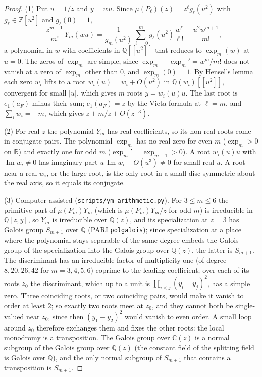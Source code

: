 \documentclass[final]{siamart0516}
\numberwithin{theorem}{section}
\numberwithin{equation}{section}
\theoremstyle{siamnonum}
\theoremstyle{plain}
\newcommand{\code}[1]{{\ttfamily\nolinkurl{#1}}}
\newcommand{\ZZ}{\mathbb{Z}}
\newcommand{\QQ}{\mathbb{Q}}
\newcommand{\RR}{\mathbb{R}}
\newcommand{\CC}{\mathbb{C}}
\newcommand{\Qz}{\QQ(z)}
\renewcommand{\Im}{\operatorname{Im}}
\begin{document}
\begin{proof}
(1) Put $u=1/z$ and $y=wu$. Since $\mu(P_\ell)(z)=z^{\ell}g_\ell(u^{2})$ with $g_\ell\in\ZZ[u^{2}]$ and $g_\ell(0)=1$,
\[
-\frac{z^{m-1}}{m!}\,Y_m(wu)=\frac{1}{g_m(u^{2})}\sum_{\ell=0}^{m}g_\ell(u^{2})\frac{w^{\ell}}{\ell!}-\frac{u^{2}w^{m+1}}{m!},
\]
a polynomial in $w$ with coefficients in $\QQ[[u^{2}]]$ that reduces to $\exp_m(w)$ at $u=0$. The zeros of $\exp_m$ are simple, since $\exp_m-\exp_m'=w^{m}/m!$ does not vanish at a zero of $\exp_m$ other than $0$, and $\exp_m(0)=1$. By Hensel's lemma each zero $w_i$ lifts to a root $w_i(u)=w_i+O(u^{2})$ in $\QQ(w_i)[[u^{2}]]$, convergent for small $|u|$, which gives $m$ roots $y=w_i(u)u$. The last root is $e_1(a_F)$ minus their sum; $e_1(a_F)=z$ by the Vieta formula at $\ell=m$, and $\sum_iw_i=-m$, which gives $z+m/z+O(z^{-3})$.

(2) For real $z$ the polynomial $Y_m$ has real coefficients, so its non-real roots come in conjugate pairs. The polynomial $\exp_m$ has no real zero for even $m$ ($\exp_m>0$ on $\RR$) and exactly one for odd $m$ ($\exp_m'=\exp_{m-1}>0$). A root $w_i(u)u$ with $\Im w_i\neq0$ has imaginary part $u\,\Im w_i+O(u^{3})\neq0$ for small real $u$. A root near a real $w_i$, or the large root, is the only root in a small disc symmetric about the real axis, so it equals its conjugate.

(3) Computer-assisted (\code{scripts/ym_arithmetic.py}). For $3\le m\le6$ the primitive part of $\mu(P_m)Y_m$ (which is $\mu(P_m)Y_m/z$ for odd $m$) is irreducible in $\QQ[z,y]$, so $Y_m$ is irreducible over $\Qz$, and its specialization at $z=3$ has Galois group $S_{m+1}$ over $\QQ$ (PARI \code{polgalois}); since specialization at a place where the polynomial stays separable of the same degree embeds the Galois group of the specialization into the Galois group over $\Qz$, the latter is $S_{m+1}$. The discriminant has an irreducible factor of multiplicity one (of degree $8,20,26,42$ for $m=3,4,5,6$) coprime to the leading coefficient; over each of its roots $z_0$ the discriminant, which up to a unit is $\prod_{i<j}(y_i-y_j)^2$, has a simple zero. Three coinciding roots, or two coinciding pairs, would make it vanish to order at least $2$; so exactly two roots meet at $z_0$, and they cannot both be single-valued near $z_0$, since then $(y_1-y_2)^2$ would vanish to even order. A small loop around $z_0$ therefore exchanges them and fixes the other roots: the local monodromy is a transposition. The Galois group over $\CC(z)$ is a normal subgroup of the Galois group over $\Qz$ (the constant field of the splitting field is Galois over $\QQ$), and the only normal subgroup of $S_{m+1}$ that contains a transposition is $S_{m+1}$.
\end{proof}
\end{document}
